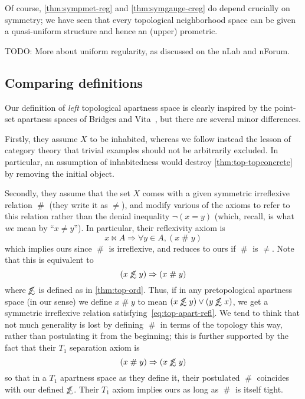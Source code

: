 \documentclass{article}
\def\apart{\mathrel{\#}}
\def\oapt{\mathrel{\!\not\,\not\lesssim}}
\let\implies\Rightarrow
\begin{document}
Of course, \cref{thm:sympmet-reg} and \cref{thm:symgauge-creg} do depend crucially on symmetry; we have seen that every topological neighborhood space can be given a quasi-uniform structure and hence an (upper) prometric.

TODO: More about uniform regularity, as discussed on the nLab and nForum.


\subsection{Comparing definitions}
\label{sec:top-compare}

Our definition of \emph{left} topological apartness space is clearly inspired by the point-set apartness spaces of Bridges and Vita~\cite[Chapter 2]{bridges-vita}, but there are several minor differences.

Firstly, they assume $X$ to be inhabited, whereas we follow instead the lesson of category theory that trivial examples should not be arbitrarily excluded.
In particular, an assumption of inhabitedness would destroy \cref{thm:top-topconcrete} by removing the initial object.

Secondly, they assume that the set $X$ comes with a given symmetric irreflexive relation $\apart$ (they write it as $\neq$), and modify various of the axioms to refer to this relation rather than the denial inequality $\neg(x=y)$ (which, recall, is what \emph{we} mean by ``$x\neq y$'').
In particular, their reflexivity axiom is
\begin{equation}
  x\bowtie A \implies \forall y\in A, (x\apart y)\label{eq:top-apart-refl}
\end{equation}
which implies ours since $\apart$ is irreflexive, and reduces to ours if $\apart$ is $\neq$.
Note that this is equivalent to
\[ (x\oapt y) \implies (x\apart y) \]
where $\oapt$ is defined as in \cref{thm:top-ord}.
Thus, if in any pretopological apartness space (in our sense) we define $x\apart y$ to mean $(x\oapt y)\lor (y\oapt x)$, we get a symmetric irreflexive relation satisfying~\eqref{eq:top-apart-refl}.
We tend to think that not much generality is lost by defining $\apart$ in terms of the topology this way, rather than postulating it from the beginning; this is further supported by the fact that their $T_1$ separation axiom is
\[ (x\apart y) \implies (x\oapt y) \]
so that in a $T_1$ apartness space as they define it, their postulated $\apart$ coincides with our defined $\oapt$.
Their $T_1$ axiom implies ours as long as $\apart$ is itself tight.
\end{document}
